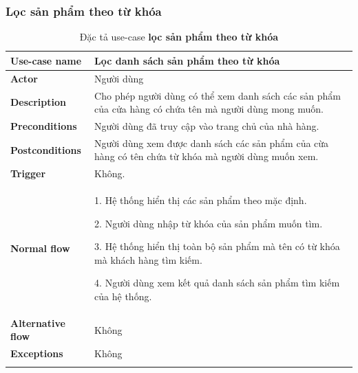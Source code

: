     \subsubsection{Lọc sản phẩm theo từ khóa} 
            \begin{center}
            
                \begin{longtable}{| p{} | p{} |} 
    \hline
    \textbf{Use-case name}
    & 
    Lọc danh sách sản phẩm theo từ khóa
    \\
    \hline
    \textbf{Actor} 
    & 
    Người dùng
    \\
    \hline
    \textbf{Description} 
    & 
    Cho phép người dùng có thể xem danh sách các sản phẩm của cửa hàng có chứa tên mà người dùng mong muốn.
    \\
    \hline
     \textbf{Preconditions} 
    &
    Người dùng đã truy cập vào trang chủ của nhà hàng.
    \\
    \hline
    \textbf{Postconditions} 
    & 
    Người dùng xem được danh sách các sản phẩm  của cừa hàng có tên chứa từ khóa mà người dùng muốn xem.
    \\
    \hline
    \textbf{Trigger} 
    & 
    Không.
    \\
    \hline
     \textbf{Normal flow}
    & 
        1. Hệ thống hiển thị các sản phẩm theo mặc định.
        
        2. Người dùng nhập từ khóa của sản phẩm muốn tìm.
        
        3. Hệ thống hiển thị toàn bộ sản phẩm mà tên có từ khóa mà khách hàng tìm kiếm.
        
        4. Người dùng xem kết quả danh sách sản phẩm tìm kiếm của hệ thống.
    \\
    \hline
    \textbf{Alternative flow}
    & 
    Không
    \\
    \hline
    \textbf{Exceptions} 
    &
    Không
    \\
    \hline
    \caption{Đặc tả use-case \textbf{lọc sản phẩm theo từ khóa}}
    \end{longtable}
    \end{center}
    

